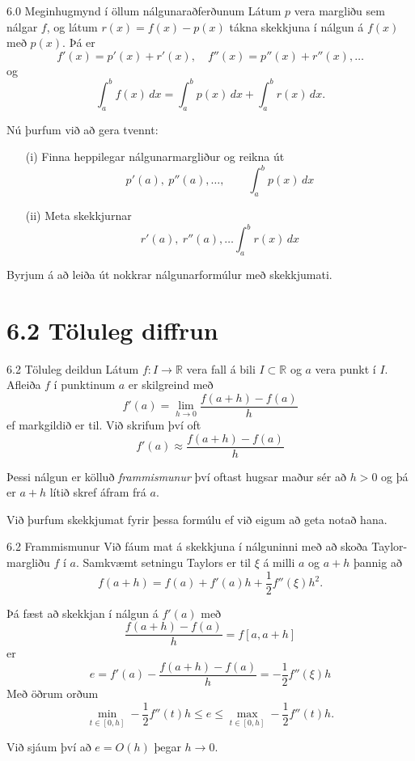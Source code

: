\begin{frame}{6.0 Meginhugmynd í öllum nálgunaraðferðunum}
Látum $p$ vera margliðu sem nálgar $f$, \pause
og látum $r(x)=f(x)-p(x)$ tákna skekkjuna í nálgun á $f(x)$ með $p(x)$.  Þá er 
$$
  f'(x)=p'(x)+r'(x), \quad f''(x)=p''(x)+r''(x), \dots 
$$
og
$$ 
  \int_a^b f(x)\, dx=\int_a^b p(x)\, dx+\int_a^b r(x)\, dx.
$$

\pause
\smallskip
Nú þurfum við að gera tvennt:
\begin{enumerate}
\item[(i)] Finna heppilegar nálgunarmargliður og reikna út
$$
  p'(a), \ p''(a),\dots, \qquad \int_a^b p(x)\, dx 
$$
\item[(ii)]  Meta skekkjurnar
$$
  r'(a), \ r''(a), \dots \int_a^b r(x)\, dx
$$
\end{enumerate}
Byrjum á að leiða út nokkrar  nálgunarformúlur með skekkjumati. 
\end{frame}

\section*{6.2 Töluleg diffrun}
\begin{frame}{6.2 Töluleg deildun} 
Látum $f : I \to \mathbb R$ vera fall á bili $I \subset \mathbb R$ og
$a$ vera punkt í $I$. Afleiða $f$ í punktinum $a$ er skilgreind með 
\begin{equation*}
  f'(a) = \lim\limits_{h \to 0}
  \frac{f(a+h)-f(a)}{h}
\end{equation*}
ef markgildið er til.  Við skrifum því oft
\begin{equation*}
  f'(a) \approx \frac{f(a+h)-f(a)}{h}
\end{equation*}

\pause
Þessi nálgun er kölluð {\em frammismunur} því oftast hugsar maður sér
að $h > 0$ og þá er $a+h$ lítið skref áfram frá $a$. 

\pause
\smallskip
Við þurfum skekkjumat fyrir þessa formúlu ef við eigum að geta notað hana.
\end{frame}


\begin{frame}{6.2 Frammismunur}
Við fáum mat á skekkjuna í nálguninni með að skoða Taylor-margliðu 
$f$ í $a$.  Samkvæmt setningu Taylors er til $\xi$ á milli $a$ og
$a+h$ þannig að  
\begin{equation*}
  f(a+h) = f(a) + f'(a)h + \frac{1}{2} f''(\xi)h^2.
\end{equation*}

\pause
Þá fæst að skekkjan í nálgun á $f'(a)$ með  
$$
  \frac{f(a+h)-f(a)}{h} = f[a,a+h]
$$ 
er 
\begin{equation*}
  e = f'(a) - \frac{f(a+h)-f(a)}{h} = -\frac{1}{2} f''(\xi) h
\end{equation*}
Með öðrum orðum
$$
\min_{t\in [0,h]} -\frac 12 f''(t)h \leq e \leq 
\max_{t\in [0,h]} -\frac 12 f''(t)h.
$$

\pause
\smallskip
Við sjáum því að $e=O(h)$ þegar $h \to 0$.
\end{frame}


